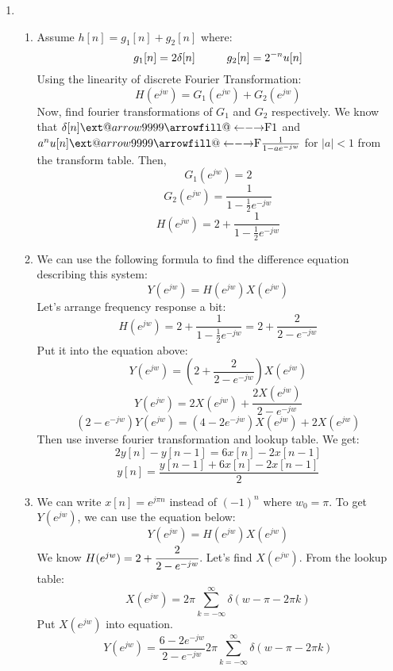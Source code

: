 \documentclass[10pt,a4paper, margin=1in]{article}
\makeatletter
\newcommand\xleftrightarrow[2][]{%
  \ext@arrow 9999{\longleftrightarrowfill@}{#1}{#2}}
\newcommand\longleftrightarrowfill@{%
  \arrowfill@\leftarrow\relbar\rightarrow}
\makeatother
\begin{document}
\begin{enumerate}
\item %
    \begin{enumerate}
    \item Assume $h[n] = g_1[n] + g_2[n]$ where:
    \[g_1[n] = 2\delta[n] \hspace{10mm} g_2[n] = 2^{-n}u[n]\]
    Using the linearity of discrete Fourier Transformation:
    \[H(e^{jw}) = G_1(e^{jw}) + G_2(e^{jw})\]
    Now, find fourier transformations of $G_1$ and $G_2$ respectively. We know that $\delta[n] \xleftrightarrow[\text{}]{\text{F}} 1$ and $a^n u[n] \xleftrightarrow[\text{}]{\text{F}} \frac{1}{1-ae^{-jw}}$ for $|a| < 1$ from the transform table. Then,
    \[G_1(e^{jw}) = 2\]
    \[G_2(e^{jw}) = \frac{1}{1-\frac{1}{2}e^{-jw}}\]
    \[H(e^{jw}) = 2 + \frac{1}{1-\frac{1}{2}e^{-jw}} \]
    \item We can use the following formula to find the difference equation describing this system:
    \[Y(e^{jw}) = H(e^{jw})X(e^{jw})\]
    Let's arrange frequency response a bit:
    \[H(e^{jw}) = 2 + \frac{1}{1-\frac{1}{2}e^{-jw}} = 2 + \frac{2}{2-e^{-jw}} \]
    Put it into the equation above:
    \[Y(e^{jw}) = (2 + \frac{2}{2-e^{-jw}})X(e^{jw})\]
    \[Y(e^{jw}) = 2X(e^{jw}) + \frac{2X(e^{jw})}{2-e^{-jw}}\]
    \[(2-e^{-jw})Y(e^{jw}) = (4-2e^{-jw})X(e^{jw}) + 2X(e^{jw})\]
    Then use inverse fourier transformation and lookup table. We get:
    \[2y[n] - y[n-1] = 6x[n] - 2x[n-1]\]
    \[y[n] = \frac{y[n-1] + 6x[n] - 2x[n-1]}{2}\]
    \item We can write $x[n] = e^{j\pi n}$ instead of $(-1)^n$ where $w_0 = \pi$. To get $Y(e^{jw})$, we can use the equation below:
    \[Y(e^{jw}) = H(e^{jw})X(e^{jw})\]
    We know $H(e^{jw}) = 2 + \cfrac{2}{2-e^{-jw}}$. Let's find $X(e^{jw})$. From the lookup table:
    \[X(e^{jw}) = 2\pi \sum_{k=-\infty}^{\infty} \delta(w - \pi - 2\pi k)\]
    Put $X(e^{jw})$ into equation.
    \[Y(e^{jw}) = \frac{6-2e^{-jw}}{2-e^{-jw}} 2\pi \sum_{k=-\infty}^{\infty} \delta(w - \pi - 2\pi k)\]
    \end{enumerate}

\end{enumerate}
\end{document}
